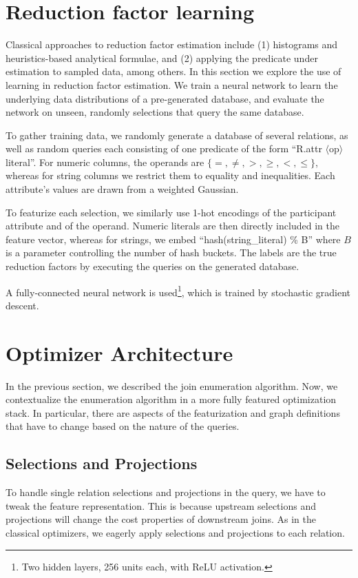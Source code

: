 \section{Reduction factor learning}
Classical approaches to reduction factor estimation include (1) histograms and
heuristics-based analytical formulae, and (2) applying the predicate under
estimation to sampled data, among others.  In this section we explore the use of
learning in reduction factor estimation.  We train a neural network to learn the
underlying data distributions of a pre-generated database, and evaluate the
network on unseen, randomly selections that query the same database.

To gather training data, we randomly generate a database of several relations,
as well as random queries each consisting of one predicate of the form ``R.attr
$\langle$op$\rangle$ literal''.  For numeric columns, the operands are $\{=,
\neq, >, \geq, <, \leq\}$, whereas for string columns we restrict them to
equality and inequalities.  Each attribute's values are drawn from a weighted
Gaussian.

To featurize each selection, we similarly use 1-hot encodings of the participant
attribute and of the operand.  Numeric literals are then directly included in
the feature vector, whereas for strings, we embed ``hash(string\_literal) \% B''
where $B$ is a parameter controlling the number of hash buckets.  The labels are
the true reduction factors by executing the queries on the generated database.

A fully-connected neural network is used\footnote{Two hidden layers, 256 units
each, with ReLU activation.}, which is trained by stochastic gradient descent.


\section{Optimizer Architecture}
In the previous section, we described the join enumeration algorithm. Now, we contextualize the enumeration algorithm in a more fully featured optimization stack. In particular, there are aspects of the featurization and graph definitions that have to change based on the nature of the queries.

\subsection*{Selections and Projections}
To handle single relation selections and projections in the query, we have to tweak the feature representation. This is because upstream selections and projections will change the cost properties of downstream joins. As in the classical optimizers, we eagerly apply selections and projections to each relation. 

